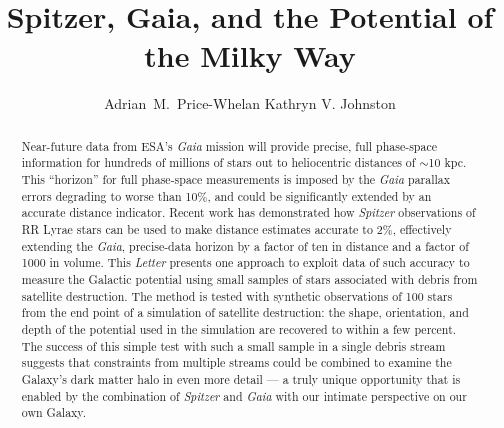 \documentclass{emulateapj}
\begin{document}
\title{Spitzer, Gaia, and the Potential of the Milky Way}

\author{Adrian~M.~Price-Whelan Kathryn V. Johnston}


\begin{abstract}

Near-future data from ESA's {\it Gaia} mission will provide precise, full phase-space information for hundreds of millions of stars out to heliocentric distances of $\sim$10 kpc. This ``horizon'' for full phase-space measurements is imposed by the {\it Gaia} parallax errors degrading to worse than 10\%, and could be significantly extended by an accurate distance indicator. Recent work has demonstrated how {\it Spitzer} observations of RR Lyrae stars can be used to make distance estimates accurate to 2\%, effectively extending the {\it Gaia}, precise-data horizon by a factor of ten in distance and a factor of 1000 in volume. This \emph{Letter} presents one approach to exploit data of such accuracy to measure the Galactic potential using small samples of stars associated with debris from satellite destruction. The method is tested with synthetic observations of 100 stars from the end point of a simulation of satellite destruction: the shape, orientation, and depth of the potential used in the simulation are recovered to within a few percent. The success of this simple test with such a small sample in a single debris stream suggests that constraints from multiple streams could be combined to examine the Galaxy's  dark matter halo in even more  detail --- a truly unique opportunity that is enabled by the combination of {\it Spitzer} and {\it Gaia} with our intimate perspective on our own Galaxy.

\end{abstract}

\end{document}
